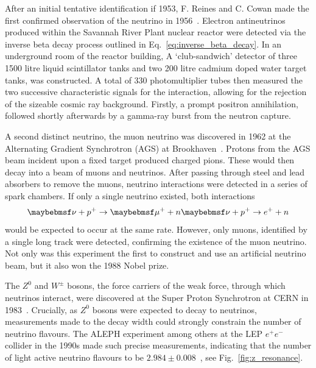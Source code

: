 After an initial tentative identification if 1953, F. Reines and C. Cowan made the first confirmed
observation of the neutrino in 1956~\cite{cowan1956}. Electron antineutrinos produced within the
Savannah River Plant nuclear reactor were detected via the inverse beta decay process outlined in
Eq.~\ref{eq:inverse_beta_decay}. In an underground room of the reactor building, A
`club-sandwich' detector of three 1500 litre liquid scintillator tanks and two 200 litre cadmium
doped water target tanks, was constructed. A total of 330 photomultiplier tubes then measured the
two successive characteristic signals for the interaction, allowing for the rejection of the
sizeable cosmic ray background. Firstly, a prompt positron annihilation, followed shortly
afterwards by a gamma-ray burst from the neutron capture.

A second distinct neutrino, the muon neutrino was discovered in 1962 at the Alternating Gradient
Synchrotron (AGS) at Brookhaven~\cite{danby1962}. Protons from the AGS beam incident upon a fixed
target produced charged pions. These would then decay into a beam of muons and neutrinos. After
passing through steel and lead absorbers to remove the muons, neutrino interactions were detected
in a series of spark chambers. If only a single neutrino existed, both interactions
\begin{equation} %
    \nu+p^{+}\rightarrow\mu^{+}+n \\
    \nu+p^{+}\rightarrow e^{+}+n
\end{equation} %
would be expected to occur at the same rate. However, only muons, identified by a single long
track were detected, confirming the existence of the muon neutrino. Not only was this experiment
the first to construct and use an artificial neutrino beam, but it also won the 1988 Nobel prize.

The $Z^{0}$ and $W^{\pm}$ bosons, the force carriers of the weak force, through which neutrinos
interact, were discovered at the Super Proton Synchrotron at CERN in
1983~\cite{arnison1983_z,arnison1983_w}. Crucially, as $Z^{0}$ bosons were expected to decay to
neutrinos, measurements made to the decay width could strongly constrain the number of neutrino
flavours. The ALEPH experiment among others at the LEP $e^{+}e^{-}$ collider in the 1990s made
such precise measurements, indicating that the number of light active neutrino flavours to be
$2.984\pm0.008$~\cite{electroweak2006}, see Fig.~\ref{fig:z_resonance}.


